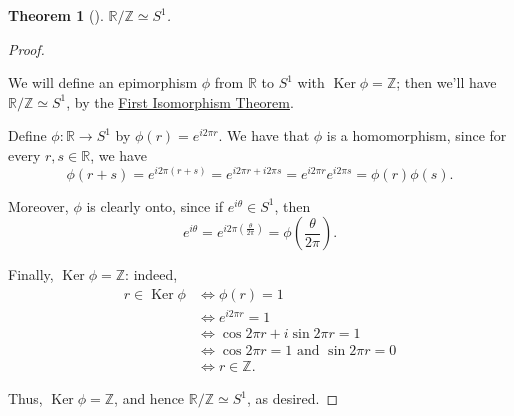 \documentclass[10pt,]{book}
\theoremstyle{plain}
\newtheorem{theorem}{Theorem}[section]
\theoremstyle{definition}
\theoremstyle{definition}
\theoremstyle{definition}
\theoremstyle{definition}
\numberwithin{equation}{section}
\def\Z{\mathbb{Z}}
\def\R{\mathbb{R}}
\DeclareMathOperator{\Ker}{Ker}
\newcommand{\amp}{&}
\begin{document}
\begin{theorem}[{}]\label{theorem-69}
\(\R/\Z \simeq S^1\).%
\end{theorem}
\begin{proof}\hypertarget{proof-58}{}
We will define an epimorphism \(\phi\) from \(\R\) to \(S^1\) with \(\Ker \phi=\Z\); then we'll have \(\R/\Z \simeq S^1\), by the \hyperref[fit]{First Isomorphism Theorem}.%
\par
Define \(\phi:\R \to S^1\) by \(\phi(r)=e^{i2\pi r}\). We have that \(\phi\) is a homomorphism, since for every \(r,s\in \R\), we have%
\begin{equation*}
\phi(r+s)=e^{i2\pi (r+s)}=e^{i2\pi r+i2\pi s}=e^{i2\pi
r}e^{i2\pi s}=\phi(r)\phi(s).
\end{equation*}
%
\par
Moreover, \(\phi\) is clearly onto, since if \(e^{i\theta}\in S^1\), then%
\begin{equation*}
e^{i\theta}=e^{i2\pi\left(\frac{\theta}{2\pi}\right)}=\phi\left(\frac{\theta}{2\pi}\right).
\end{equation*}
%
\par
Finally, \(\Ker\phi=\Z\): indeed,%
\begin{align*}
r\in \Ker\phi \amp \Leftrightarrow \phi(r)=1\\
\amp \Leftrightarrow e^{i2\pi r}=1\\
\amp \Leftrightarrow \cos 2\pi r + i\sin 2\pi r=1\\
\amp \Leftrightarrow \cos 2\pi r = 1 \text{ and } \sin 2\pi r = 0\\
\amp \Leftrightarrow r\in \Z.
\end{align*}
%
\par
Thus, \(\Ker \phi = \Z\), and hence \(\R/\Z\simeq S^1\), as desired.%
\end{proof}
\typeout{************************************************}
\typeout{************************************************}
\end{document}
